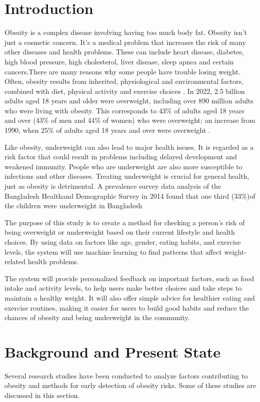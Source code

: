 

\section{ Introduction }
\label{intro}

Obesity is a complex disease involving having too much body fat. Obesity isn't just a cosmetic concern. It's a medical problem that increases the risk of many other diseases and health problems. These can include heart disease, diabetes, high blood pressure, high cholesterol, liver disease, sleep apnea and certain cancers.There are many reasons why some people have trouble losing weight. Often, obesity results from inherited, physiological and environmental factors, combined with diet, physical activity and exercise choices \cite{MayoClinicObesity}. In 2022, 2.5 billion adults aged 18 years and older were overweight, including over 890 million adults who were living with obesity. This corresponds to 43\% of adults aged 18 years and over (43\% of men and 44\% of women) who were overweight; an increase from 1990, when 25\% of adults aged 18 years and over were overweight \cite{WHOObesity}.

Like obesity, underweight can also lead to major health issues. It is regarded as a risk factor that could result in problems including delayed development and weakened immunity. People who are underweight are also more susceptible to infections and other diseases. Treating underweight is crucial for general health, just as obesity is detrimental. A prevalence survey data analysis of the Bangladesh Healthand Demographic Survey in 2014 found that one third (33\%)of the children were underweight in Bangladesh \cite{Hossain2018} 

The purpose of this study is to create a method for checking a person's risk of being overweight or underweight based on their current lifestyle and health choices. By using data on factors like age, gender, eating habits, and exercise levels, the system will use machine learning to find patterns that affect weight-related health problems.

The system will provide personalized feedback on important factors, such as food intake and activity levels, to help users make better choices and take steps to maintain a healthy weight. It will also offer simple advice for healthier eating and exercise routines, making it easier for users to build good habits and reduce the chances of obesity and being underweight in the community.
\section{Background and Present State}
Several research studies have been conducted to analyze factors contributing to obesity and methods for early detection of obesity risks. Some of these studies are discussed in this section. 

